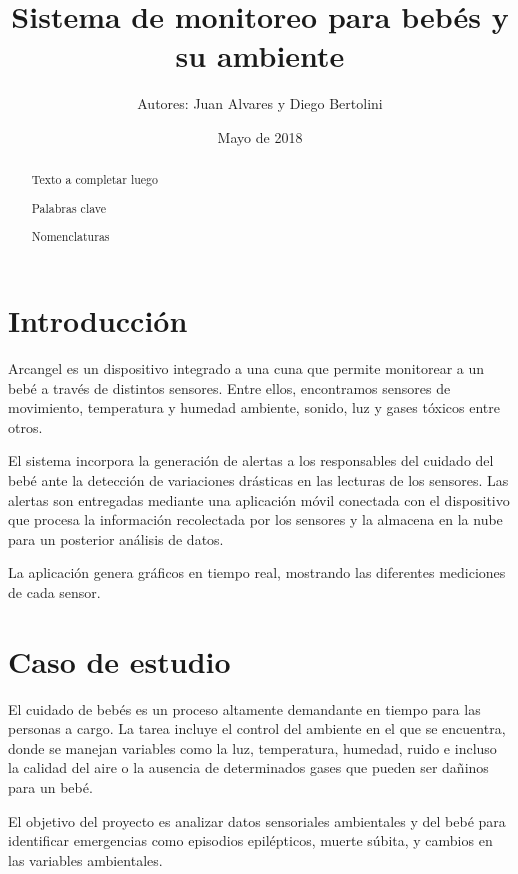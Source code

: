 \documentclass{IEEEtran}
\begin{document}
	\title{Sistema de monitoreo para bebés y su ambiente}
	\author{Autores: Juan Alvares y Diego Bertolini}
	\date{Mayo de 2018}
	\maketitle

	\begin{abstract}
		Texto a completar luego

		Palabras clave

		Nomenclaturas
	\end{abstract}

	\section{Introducción}


		Arcangel es un dispositivo integrado a una cuna que permite monitorear a un bebé a través de distintos sensores. Entre ellos, encontramos sensores de movimiento, temperatura y humedad ambiente, sonido, luz y gases tóxicos entre otros.

		El sistema incorpora la generación de alertas a los responsables del cuidado del bebé ante la detección de variaciones drásticas en las lecturas de los sensores. Las alertas son entregadas mediante una aplicación móvil conectada con el dispositivo que procesa la información recolectada por los sensores y la almacena en la nube para un posterior análisis de datos.

		La aplicación genera gráficos en tiempo real, mostrando las diferentes mediciones de cada sensor.

	\section{Caso de estudio}

		El cuidado de bebés es un proceso altamente demandante en tiempo para las personas a cargo. La tarea incluye el control del ambiente en el que se encuentra, donde se manejan variables como la luz, temperatura, humedad, ruido e incluso la calidad del aire o la ausencia de determinados gases que pueden ser dañinos para un bebé.

		El objetivo del proyecto es analizar datos sensoriales ambientales y del bebé para identificar emergencias como episodios epilépticos, muerte súbita, y cambios en las variables ambientales.
\end{document}

